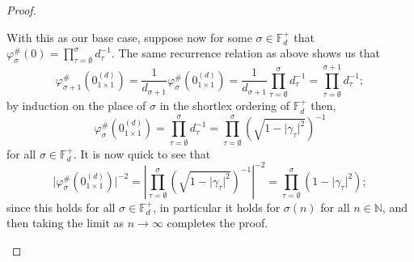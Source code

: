 \documentclass[11pt,reqno]{amsart}
\def\p{\varphi}
\def\g{\gamma}
\def\s{\sigma}
\def\t{\tau}
\def\NN{\mathbb{N}}
\def\FF{\mathbb{F}}
\theoremstyle{definition}
\numberwithin{equation}{section}
\begin{document}
\begin{proof}
\begin{enumerate}[align=left]
        With this as our base case, suppose now for some \(\s \in \FF_d^+\) that \(\p^{\#}_\s(0) = \prod_{\t = \emptyset}^{\s}d_\t^{-1}\). The same recurrence relation as above shows us that
        \[
            \p^{\#}_{\s + 1}(0^{(d)}_{1 \times 1}) = \frac{1}{d_{\s+1}} \p^{\#}_{\s}(0^{(d)}_{1 \times 1}) = \frac{1}{d_{\s+1}}\prod_{\t = \emptyset}^{\s}d_\t^{-1} = \prod_{\t = \emptyset}^{\s + 1}d_\t^{-1};
        \]
        by induction on the place of \(\s\) in the shortlex ordering of \(\FF_d^+\) then, 
        \[
            \p^{\#}_\s(0^{(d)}_{1 \times 1}) = \prod_{\t = \emptyset}^{\s}d_\t^{-1} = \prod_{\t = \emptyset}^{\s} \left(\sqrt{1 - \lvert \g_\t \rvert^2}\right)^{-1}
        \]
        for all \(\s \in \FF_d^+\). It is now quick to see that
        \[
            \lvert \p^{\#}_\s(0^{(d)}_{1 \times 1}) \rvert^{-2} = \left \lvert \prod_{\t = \emptyset}^{\s} \left(\sqrt{1 - \lvert \g_\t \rvert^2}\right)^{-1} \right\rvert^{-2} = \prod_{\t = \emptyset}^{\s} (1 - \lvert \g_\t \rvert^2);
        \]
        since this holds for all \(\s \in \FF_d^+\), in particular it holds for \(\s(n)\) for all \(n \in \NN\), and then taking the limit as \(n \to \infty\) completes the proof.

        \bigskip


\end{enumerate}
\end{proof}
\end{document}
